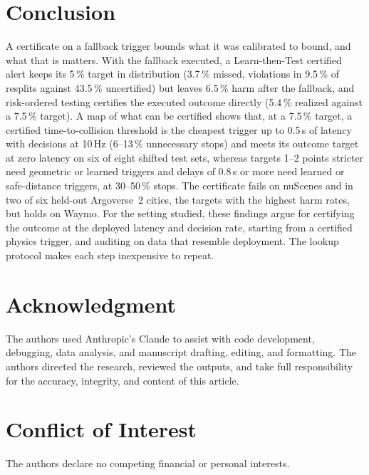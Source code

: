 \documentclass[lettersize,journal]{IEEEtran}
\begin{document}
\section{Conclusion}
\label{sec:conclusion}
A certificate on a fallback trigger bounds what it was calibrated to
bound, and what that is matters. With the fallback executed, a
Learn-then-Test certified alert keeps its 5\,\% target in distribution
(3.7\,\% missed, violations in 9.5\,\% of resplits against 43.5\,\%
uncertified) but leaves 6.5\,\% harm after the fallback, and risk-ordered
testing certifies the executed outcome directly (5.4\,\% realized against a
7.5\,\% target). A map of what can be certified shows that, at a 7.5\,\% target, a certified
time-to-collision threshold is the cheapest trigger up to 0.5\,s of latency
with decisions at 10\,Hz (6--13\,\% unnecessary stops) and meets its
outcome target at zero latency on six of eight shifted test sets, whereas
targets 1--2 points stricter need geometric or learned triggers and delays of
0.8\,s or more need learned or safe-distance triggers, at 30--50\,\% stops. The
certificate fails on nuScenes and in two of six held-out Argoverse~2 cities,
the targets with the highest harm rates, but holds on Waymo. For the setting
studied, these findings argue for certifying the outcome at the deployed
latency and decision rate, starting from a certified physics trigger, and
auditing on data that resemble deployment. The lookup protocol makes each
step inexpensive to repeat.

\section*{Acknowledgment}
The authors used Anthropic's Claude to assist with code development, debugging, data analysis, and manuscript drafting, editing, and formatting. The authors directed the research, reviewed the outputs, and take full responsibility for the accuracy, integrity, and content of this article.

\section*{Conflict of Interest}
The authors declare no competing financial or personal interests.
\end{document}
